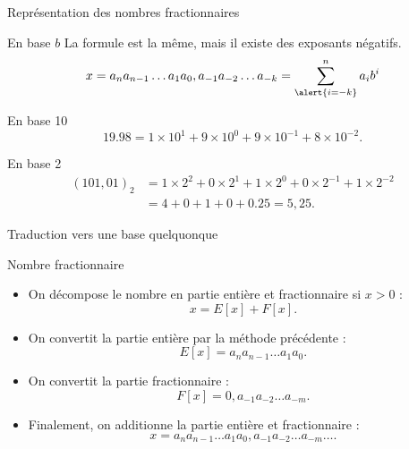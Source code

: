 \begin{frame}{Représentation des nombres fractionnaires}
  \begin{block}{En base $b$}
    La formule est la même, mais il existe des exposants négatifs.
    \[
      x = a_n a_{n-1} \ldots a_1 a_0,a_{-1}a_{-2}\ldots a_{-k} = \sum_{\alert{i=-k}}^n a_i b^i
    \]
  \end{block}

  \begin{exampleblock}{En base 10}
    \[
      19.98 = 1 \times 10^1 + 9 \times 10^0 + 9 \times 10^{-1} + 8 \times 10^{-2} .
    \]
  \end{exampleblock}
  \begin{exampleblock}{En base 2}
    \begin{align*}
      (101,01)_2 &= 1 \times 2^2 + 0 \times 2^1 + 1 \times 2^0 +  0 \times 2^{-1} + 1 \times 2^{-2} \\
      &= 4  + 0 + 1 + 0 + 0.25 = 5,25.
    \end{align*}
  \end{exampleblock}

\end{frame}

\begin{frame}{Traduction vers une base quelquonque}
    \begin{block}{Nombre fractionnaire}
        \begin{itemize}
        \item On décompose le nombre en partie entière et fractionnaire si $x > 0$ :
          $$x = E[x] + F[x].$$
        \item On convertit la partie entière par la méthode précédente :
          $$E[x] =  a_n a_{n-1} \ldots a_1 a_0.$$
        \item On convertit la partie fractionnaire :
          $$F[x] = 0,a_{-1}a_{-2}\dots a_{-m}.$$
        \item Finalement, on additionne la partie entière et fractionnaire :
          $$x =  a_n a_{n-1} \ldots a_1 a_0,a_{-1}a_{-2}\dots a_{-m}\dots.$$
       \end{itemize}
  \end{block}

\end{frame}

